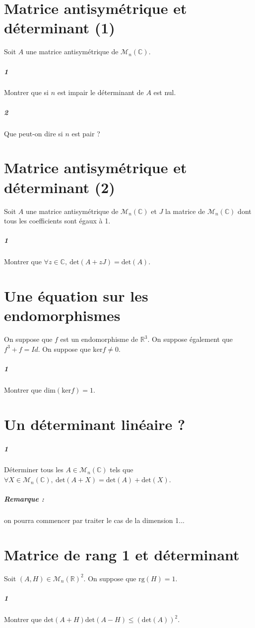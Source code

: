 \documentclass[10pt,a4paper]{article}
\begin{document}
\section{Matrice antisymétrique et déterminant (1)}
Soit $A$ une matrice antisymétrique de $\mathcal{M}_n\left( \mathbb{C} \right)$.
\subparagraph{1}Montrer que si $n$ est impair le déterminant de $A$ est nul.
\subparagraph{2}Que peut-on dire si $n$ est pair ?

\section{Matrice antisymétrique et déterminant (2)}
Soit $A$ une matrice antisymétrique de $\mathcal{M}_n\left( \mathbb{C} \right)$ et $J$ la matrice de $\mathcal{M}_n \left( \mathbb{C} \right)$ dont tous les coefficients sont égaux à 1.
\subparagraph{1}Montrer que $\forall z \in \mathbb{C}, \ \text{det}(A+zJ) = \text{det}(A)$.

\section{Une équation sur les endomorphismes}
On suppose que $f$ est un endomorphisme de $\mathbb{R}^3$. On suppose également que $f^3+f=Id$. On suppose que $\text{ker}f \neq 0$.
\subparagraph{1}Montrer que $\text{dim}(\text{ker}f)=1$.

\section{Un déterminant linéaire ?}
\subparagraph{1}Déterminer tous les $A \in \mathcal{M}_n\left( \mathbb{C} \right)$ tels que $\forall X\in \mathcal{M}_n \left( \mathbb{C} \right), \ \text{det}(A+X)=\text{det}(A)+ \text{det}(X)$.
\subparagraph{Remarque :} on pourra commencer par traiter le cas de la dimension 1...

\section{Matrice de rang 1 et déterminant}
Soit $(A,H) \in \mathcal{M}_n\left( \mathbb{R} \right)^2$. On suppose que $\text{rg}(H)=1$.
\subparagraph{1}Montrer que $\text{det}(A+H)\text{det}(A-H) \le \left( \text{det}(A) \right)^2$.
\end{document}
